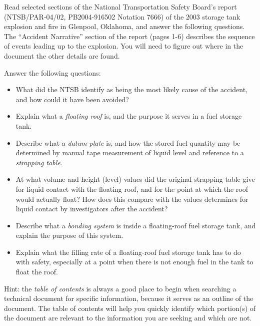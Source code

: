 

Read selected sections of the National Transportation Safety Board's report (NTSB/PAR-04/02, PB2004-916502 Notation 7666) of the 2003 storage tank explosion and fire in Glenpool, Oklahoma, and answer the following questions.  The ``Accident Narrative'' section of the report (pages 1-6) describes the sequence of events leading up to the explosion.  You will need to figure out where in the document the other details are found.

\vskip 10pt

Answer the following questions:

\begin{itemize}
\item{} What did the NTSB identify as being the most likely cause of the accident, and how could it have been avoided?
\item{} Explain what a {\it floating roof} is, and the purpose it serves in a fuel storage tank.
\item{} Describe what a {\it datum plate} is, and how the stored fuel quantity may be determined by manual tape measurement of liquid level and reference to a {\it strapping table}.
\item{} At what volume and height (level) values did the original strapping table give for liquid contact with the floating roof, and for the point at which the roof would actually float?  How does this compare with the values determines for liquid contact by investigators after the accident?
\item{} Describe what a {\it bonding system} is inside a floating-roof fuel storage tank, and explain the purpose of this system.
\item{} Explain what the filling rate of a floating-roof fuel storage tank has to do with safety, especially at a point when there is not enough fuel in the tank to float the roof.
\end{itemize}








Hint: the {\it table of contents} is always a good place to begin when searching a technical document for specific information, because it serves as an outline of the document.  The table of contents will help you quickly identify which portion(s) of the document are relevant to the information you are seeking and which are not.

